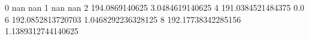 0 nan nan
1 nan nan
2 194.0869140625 3.0484619140625
4 191.0384521484375 0.0
6 192.0852813720703 1.0468292236328125
8 192.17738342285156 1.1389312744140625
